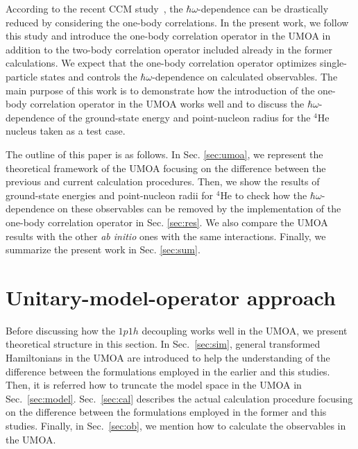 \documentclass[aps,prc, dvips, twocolumn,groupedaddress,showkeys,showpacs,floatfix,superscriptaddress]{revtex4-1}
\newcommand{\<}{\langle}
\renewcommand{\>}{\rangle}
\begin{document}
According to the recent CCM study~\cite{Kohno:2012}, the $\hbar\omega$-dependence can be
drastically reduced by considering the one-body correlations.
In the present work, we follow this study and introduce the one-body correlation operator in the UMOA
in addition to the two-body correlation operator included already in the former calculations.
We expect that the one-body correlation operator optimizes single-particle states and
 controls the $\hbar\omega$-dependence on calculated observables.
The main purpose of this work is to demonstrate how the introduction of the one-body correlation operator
in the UMOA works well and to discuss the $\hbar\omega$-dependence of the ground-state
 energy and point-nucleon radius for the $^4$He nucleus taken as a test case.

The outline of this paper is as follows.
In Sec. \ref{sec:umoa}, we represent the theoretical framework of the UMOA
focusing on the difference between the previous and current calculation procedures.
Then, we show the results of ground-state energies and point-nucleon radii for $^{4}$He
to check how the $\hbar\omega$-dependence on these observables
can be removed by the implementation of the one-body correlation operator in Sec. \ref{sec:res}.
We also compare the UMOA results with the other {\it ab initio} ones with the same interactions.
Finally, we summarize the present work in Sec. \ref{sec:sum}.


\section{\label{sec:umoa}Unitary-model-operator approach}
Before discussing how the $1p1h$ decoupling works well in the UMOA,
we present theoretical structure in this section.
In Sec.~\ref{sec:sim}, general transformed Hamiltonians in the UMOA are introduced
to help the understanding of the difference between the formulations employed
in the earlier and this studies.
Then, it is referred how to truncate the model space in the UMOA in Sec.~\ref{sec:model}.
Sec.~\ref{sec:cal} describes the actual calculation procedure
focusing on the difference between the formulations employed in the former and this studies.
 Finally, in Sec.~\ref{sec:ob}, we mention how to calculate the observables in the UMOA.
\end{document}

